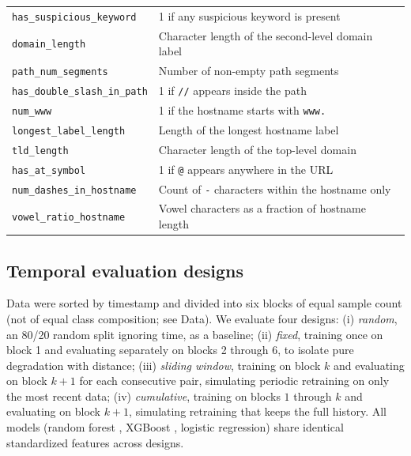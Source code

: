 \documentclass[10pt, a4paper, oneside]{article}
\begin{document}
\begin{table}[htbp]
\begin{tabular}{ll}
\texttt{has\_suspicious\_keyword} & 1 if any suspicious keyword is present \\
\texttt{domain\_length} & Character length of the second-level domain label \\
\texttt{path\_num\_segments} & Number of non-empty path segments \\
\texttt{has\_double\_slash\_in\_path} & 1 if \texttt{//} appears inside the path \\
\texttt{num\_www} & 1 if the hostname starts with \texttt{www.} \\
\texttt{longest\_label\_length} & Length of the longest hostname label \\
\texttt{tld\_length} & Character length of the top-level domain \\
\texttt{has\_at\_symbol} & 1 if \texttt{@} appears anywhere in the URL \\
\texttt{num\_dashes\_in\_hostname} & Count of \texttt{-} characters within the hostname only \\
\texttt{vowel\_ratio\_hostname} & Vowel characters as a fraction of hostname length \\
\bottomrule
\end{tabular}
\end{table}

\subsection{Temporal evaluation designs}
Data were sorted by timestamp and divided into six blocks of equal sample count (not of equal class composition; see Data). We evaluate four designs: (i) \emph{random}, an 80/20 random split ignoring time, as a baseline; (ii) \emph{fixed}, training once on block 1 and evaluating separately on blocks 2 through 6, to isolate pure degradation with distance; (iii) \emph{sliding window}, training on block $k$ and evaluating on block $k+1$ for each consecutive pair, simulating periodic retraining on only the most recent data; (iv) \emph{cumulative}, training on blocks $1$ through $k$ and evaluating on block $k+1$, simulating retraining that keeps the full history. All models (random forest \cite{breiman2001random}, XGBoost \cite{chen2016xgboost}, logistic regression) share identical standardized features across designs.
\end{document}
